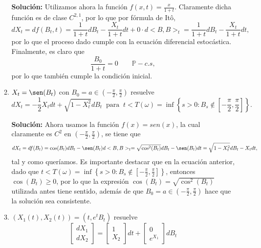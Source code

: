 \documentclass[letterpaper]{article}
\renewcommand{\P}{\mathbb{P}}
\newcommand{\1}{\mathds{1}}
\theoremstyle{definition}
\theoremstyle{definition}
\theoremstyle{definition}
\theoremstyle{definition}
\theoremstyle{definition}
\begin{document}
\begin{enumerate}
\begin{enumerate}
        \textbf{Solución:} Utilizamos ahora la función $f(x,t)=\frac{x}{1+t}$. Claramente dicha función es de clase $C^{2,1}$, por 
        lo que por fórmula de Itô,
        \[
            dX_t=df(B_t,t)=\frac{1}{1+t}dB_t-\frac{X_t}{1+t}dt+0\cdot d<B,B>_t=\frac{1}{1+t}dB_t-\frac{X_t}{1+t}dt,  
        \] 
        por lo que el proceso dado cumple con la ecuación diferencial estocástica. Finalmente, es claro que 
        \[
        \frac{B_0}{1+t}=0 \qquad \P-c.s,    
        \]
        por lo que también cumple la condición inicial.
        \item $X_t=\sen(B_t)$ con $B_0=a \in \left(-\frac{\pi}{2},\frac{\pi}{2}\right)$ resuelve
        \[
            dX_t=-\frac{1}{2}X_t dt + \sqrt{1-X_t^2}dB_t \ \text{ para } \ t<T(\omega)=\inf \left\{s>0 : B_s \not \in \left[-\frac{\pi}{2},\frac{\pi}{2}\right]\right\}.
        \]
        
        \textbf{Solución:} Ahora usamos la función $f(x)=sen(x)$, la cual claramente es $C^2$ en $(-\frac{\pi}{2},\frac{\pi}{2})$, se tiene que
        \[
        dX_t=df(B_t)=\cos(B_t)dB_t-\sen(B_t)d<B,B>_t=\sqrt{\cos^2(B_t)}dB_t-\sen(B_t)dt=\sqrt{1-X_t^2}dB_t-X_tdt,  
        \]
        tal y como queríamos. Es importante destacar que en la ecuación anterior, dado que $t<T(\omega)=\inf \left\{s>0 : B_s \not \in \left[-\frac{\pi}{2},\frac{\pi}{2}\right]\right\}$,
        entonces $\cos(B_t)\geq0$, por lo que la expresión $\cos(B_t)=\sqrt{\cos^2(B_t)}$ utilizada antes tiene sentido, además de que $B_0=a\in  \left(-\frac{\pi}{2},\frac{\pi}{2}\right)$ hace que la 
        solución sea consistente.
        \item $(X_1(t),X_2(t))=(t,e^{t}B_t)$ resuelve 
        \[
        \begin{bmatrix}
            dX_1\\
            dX_2
        \end{bmatrix}
        =
        \begin{bmatrix}
            1\\
            X_2
        \end{bmatrix}dt
        +
        \begin{bmatrix}
            0\\
            e^{X_1}
        \end{bmatrix}dB_t
        \]  
                

\end{enumerate}
\end{enumerate}
\end{document}
